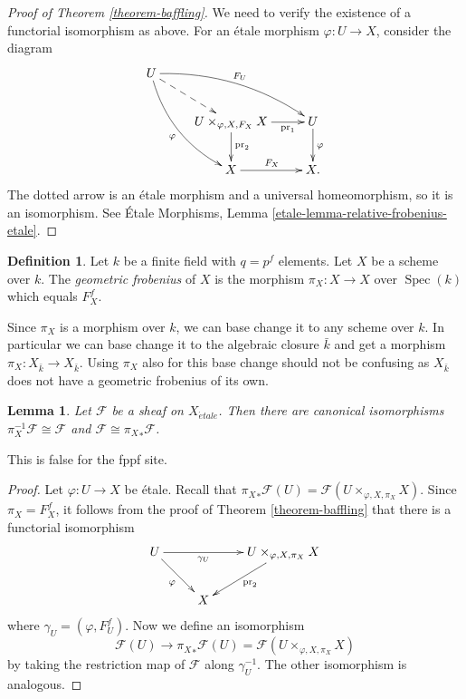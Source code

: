 \documentclass{stacks-project}
\theoremstyle{plain}
\newtheorem{lemma}[subsection]{Lemma}
\theoremstyle{definition}
\newtheorem{definition}[subsection]{Definition}
\theoremstyle{remark}
\numberwithin{equation}{subsection}
\def\Spec{\mathop{\mathrm{Spec}}}
\def\etale{{\acute{e}tale}}
\begin{document}
\begin{proof}[Proof of Theorem \ref{theorem-baffling}]
We need to verify the existence of a functorial isomorphism as above. For an
\'etale morphism $\varphi : U \to X$, consider the diagram
$$
\xymatrix{
U \ar@{-->}[rd] \ar@/^1pc/[rrd]^{F_U}
\ar@/_1pc/[rdd]_\varphi \\
& {U \times_{\varphi, X, F_X} X} \ar[r]_-{\text{pr}_1}
\ar[d]^{\text{pr}_2} & U \ar[d]^\varphi \\
& X \ar[r]^{F_X} & X.
}
$$
The dotted arrow is an \'etale morphism and a universal
homeomorphism, so it is an isomorphism. See
\'Etale Morphisms, Lemma \ref{etale-lemma-relative-frobenius-etale}.
\end{proof}


\begin{definition}
\label{definition-geometric-frobenius}
Let $k$ be a finite field with $q = p^f$ elements. Let $X$ be a scheme
over $k$. The {\it geometric frobenius} of $X$ is the morphism
$\pi_X : X \to X$ over $\Spec(k)$ which equals $F_X^f$.
\end{definition}

\noindent
Since $\pi_X$ is a morphism over $k$, we can base change it to any scheme over
$k$. In particular we can base change it to the algebraic closure $\bar k$
and get a morphism $\pi_X : X_{\bar k} \to X_{\bar k}$. Using $\pi_X$ also
for this base change should not be
confusing as $X_{\bar k}$ does not have a geometric frobenius of its own.

\begin{lemma}
\label{lemma-sheaf-over-finite-field-has-frobenius-descent}
Let $\mathcal{F}$ be a sheaf on $X_\etale$.
Then there are canonical isomorphisms
$\pi_X^{-1} \mathcal{F} \cong \mathcal{F}$ and
$\mathcal{F} \cong {\pi_X}_*\mathcal{F}$.
\end{lemma}

\noindent
This is false for the fppf site.

\begin{proof}
Let $\varphi : U \to X$ be \'etale. Recall that
${\pi_X}_* \mathcal{F} (U) = \mathcal{F} (U \times_{\varphi, X, \pi_X} X)$.
Since $\pi_X = F_X^f$, it follows from the proof of
Theorem \ref{theorem-baffling} that there is a functorial isomorphism
$$
\xymatrix{
U \ar[rd]_{\varphi} \ar[rr]_-{\gamma_U}
& & U \times_{\varphi, X, \pi_X} X \ar[ld]^{\text{pr}_2} \\
& X
}
$$
where $\gamma_U = (\varphi, F_U^f)$. Now we define an
isomorphism
$$
\mathcal{F} (U) \longrightarrow {\pi_X}_* \mathcal{F} (U) =
\mathcal{F} (U \times_{\varphi, X, \pi_X} X)
$$
by taking the restriction map of $\mathcal{F}$ along $\gamma_U^{-1}$.
The other isomorphism is analogous.
\end{proof}
\end{document}
